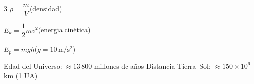 \documentclass[10pt]{article}
\begin{document}
\vspace{0.4cm}
\begin{tcolorbox}[colback=grisclaro, colframe=azulprim!50, arc=3pt,
  title=\textbf{Datos útiles}, coltitle=azulprim, colbacktitle=azulclaro]
\begin{multicols}{3}
$\rho = \dfrac{m}{V}$\quad (densidad)

\columnbreak

$E_k = \dfrac{1}{2}mv^2$\quad (energía cinética)

\columnbreak

$E_p = mgh$\quad ($g = 10\,\mathrm{m/s^2}$)
\end{multicols}
\vspace{2pt}
Edad del Universo: $\approx 13\,800$ millones de años \hfill
Distancia Tierra--Sol: $\approx 150 \times 10^6$ km (1 UA)
\end{tcolorbox}
\end{document}
